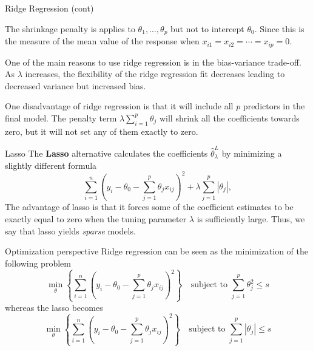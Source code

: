\documentclass{beamer}
\begin{document}
\begin{frame}{Ridge Regression (cont)}
	
	The shrinkage penalty is applies to $\theta_1,\ldots, \theta_p$ but not to intercept $\theta_0$.  Since this is the measure of the mean value of the response when $x_{i1}=x_{i2}=\cdots=x_{ip}=0$.
	
	One of the main reasons to use ridge regression is in the bias-variance trade-off. As $\lambda $ increases, the flexibility of the ridge regression fit decreases leading to decreased variance but increased bias. 
	
	One disadvantage of ridge regression is that it will include all $p$ predictors in the final model. The penalty term $\lambda \sum_{i=1}^p \theta_j$ will shrink all the coefficients towards zero, but it will not set any of them exactly to zero. 
\end{frame}

\begin{frame}{Lasso}
	The {\bf Lasso} alternative calculates the coefficients $\hat{\theta}_\lambda^L$ by minimizing a slightly different formula
\begin{equation*}
	\sum_{i=1}^n \left( y_i - \theta_0 - \sum_{j=1}^p \theta_j x_{ij} \right)^2 + \lambda \sum_{j=1}^p |\theta_j|,
\end{equation*} 	
	The advantage of lasso is that it forces some of the coefficient estimates to be exactly equal to zero when the tuning parameter $\lambda$ is sufficiently large. Thus, we say that lasso yields {\it sparse} models.
\end{frame}

\begin{frame}{Optimization perspective}
	Ridge regression can be seen as the minimization of the following problem
	\begin{equation*}
		\min_{\theta} \left\{ \sum_{i=1}^n \left( y_i - \theta_0 - \sum_{j=1}^p \theta_j x_{ij} \right)^2 \right\} \quad\textrm{subject to }   \sum_{j=1}^p \theta_j^2 \le s
	\end{equation*} 
whereas the lasso becomes 
\begin{equation*}
	\min_{\theta} \left\{ \sum_{i=1}^n \left( y_i - \theta_0 - \sum_{j=1}^p \theta_j x_{ij} \right)^2 \right\} \quad\textrm{subject to }   \sum_{j=1}^p |\theta_j | \le s
\end{equation*} 

\end{frame}
\end{document}
